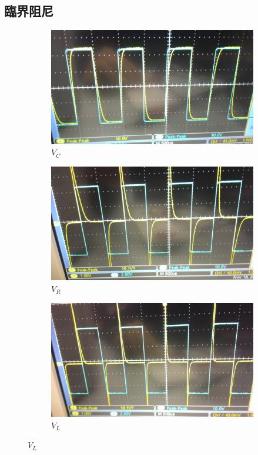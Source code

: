 \documentclass[12pt, a4paper]{article}
\begin{document}
\subsection{臨界阻尼}
\begin{figure}[H]
  \centering
  \begin{subfigure}[b]{0.6\textwidth}
    \includegraphics[width=1\textwidth]{data/pic/P_20141118_191631.jpg}
    \caption{$V_C$}
  \end{subfigure}
  \begin{subfigure}[b]{0.6\textwidth}
    \includegraphics[width=1\textwidth]{data/pic/P_20141118_191610.jpg}
    \caption{$V_R$}
  \end{subfigure}
  \begin{subfigure}[b]{0.6\textwidth}
    \includegraphics[width=1\textwidth]{data/pic/P_20141118_191333.jpg}
    \caption{$V_L$}
  \end{subfigure}
\end{figure}
\end{document}
